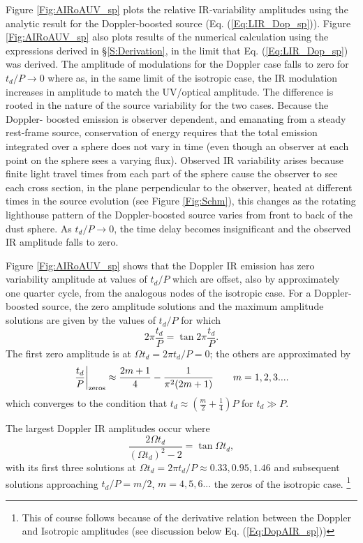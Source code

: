Figure \ref{Fig:AIRoAUV_sp} plots the relative IR-variability amplitudes using
the analytic result for the Doppler-boosted source (Eq.
(\ref{Eq:LIR_Dop_sp})).  Figure \ref{Fig:AIRoAUV_sp} also plots results of the
numerical calculation using the  expressions derived in \S \ref{S:Derivation},
in the limit that Eq. (\ref{Eq:LIR_Dop_sp}) was derived. The amplitude of
modulations for the Doppler case falls to zero for $t_d/P \rightarrow 0$ where
as, in the same limit of the isotropic case, the IR modulation increases in
amplitude to match the UV/optical amplitude. The difference is rooted in the
nature of the source variability for the two cases. Because the Doppler-
boosted emission is observer dependent, and emanating from a steady rest-frame
source, conservation of energy requires that the total emission integrated
over a sphere does not vary in time (even though an observer at each point on
the sphere sees a varying flux). Observed IR variability arises because finite
light travel times from each part of the sphere cause the observer to see each
cross section, in the plane perpendicular to the observer, heated at different
times in the source evolution (see Figure \ref{Fig:Schm}), this changes as the
rotating lighthouse pattern of the Doppler-boosted source varies from front to
back of the dust sphere. As $t_d/P \rightarrow 0$, the time delay becomes
insignificant and the observed IR amplitude falls to zero.



Figure \ref{Fig:AIRoAUV_sp} shows that the Doppler IR emission has zero
variability amplitude at values of $t_d/P$ which are offset, also by
approximately one quarter cycle, from the analogous nodes of the isotropic
case. For a Doppler-boosted source, the zero amplitude solutions
and the maximum amplitude solutions are given by the values of $t_d/P$ for
which
\begin{equation}
2 \pi \frac{t_d}{P} = \tan{2 \pi \frac{t_d}{P}}.
\label{Eq:DopZeros}
\end{equation}
The first zero amplitude is at $\Omega t_d = 2 \pi t_d/P = 0$; the others are approximated by
\begin{equation}
\left. \frac{t_d}{P} \right|_{\rm{zeros}} \approx  \frac{2m + 1}{4} - \frac{1}{\pi^2 (2m+1)}   \qquad m=1,2,3... .
\end{equation}
which converges to the condition that $t_d \approx \left( \frac{m}{2} +
\frac{1}{4}\right) P$ for $t_d \gg P$.

The largest Doppler IR amplitudes occur where 
\begin{equation}
\frac{2 \Omega t_d}{(\Omega t_d)^2 -2} =  \tan{\Omega t_d},
\label{Eq:DopExtrm}
\end{equation}
with its first three solutions at $\Omega t_d = 2 \pi t_d/P \approx 0.33, 0.95,
1.46$ and subsequent solutions approaching $t_d/P = m/2$, $m=4,5,6...$ the
zeros of the isotropic case. \footnote{This of course follows because of the
derivative relation between the Doppler and Isotropic amplitudes (see
discussion below Eq. (\ref{Eq:DopAIR_sp}))}




